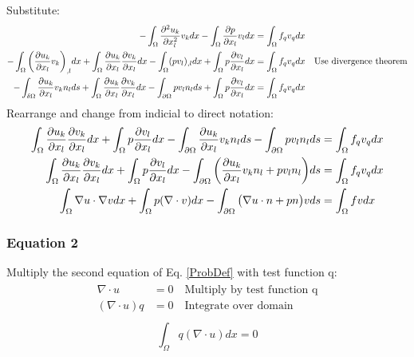 \documentclass[12pt,3p]{article}
\begin{document}
Substitute: 
\begin{align*}
- \int_{\Omega} \pdv[2]{u_k}{x_l} v_k dx - \int_{\Omega} \pdv{p}{x_l} v_l dx &= \int_{\Omega} f _q v_q dx \\
- \int_{\Omega} \bigg(\pdv{u_k}{x_l} v_k \bigg)_{,l} dx + \int_{\Omega} \pdv{u_k}{x_l} \pdv{v_k}{x_l} dx - \int_{\Omega} (p v_l)_{,l} dx + \int_{\Omega} p \pdv{v_l}{x_l} dx &= \int_{\Omega} f _q v_q dx \quad \text{Use divergence theorem} \\
- \int_{\delta \Omega} \pdv{u_k}{x_l} v_k n_l ds + \int_{\Omega} \pdv{u_k}{x_l} \pdv{v_k}{x_l} dx - \int_{\partial \Omega} p v_l n_l ds + \int_{\Omega} p \pdv{v_l}{x_l} dx &= \int_{\Omega} f _q v_q dx 
\end{align*}
Rearrange and change from indicial to direct notation: 
\begin{align*}
\begin{split}
\int_{\Omega} \pdv{u_k}{x_l} \pdv{v_k}{x_l} dx + \int_{\Omega} p \pdv{v_l}{x_l} dx - \int_{\partial \Omega} \pdv{u_k}{x_l} v_k n_l ds - \int_{\partial \Omega} p v_l n_l ds&= \int_{\Omega} f _q v_q dx   \\ 
\int_{\Omega} \pdv{u_k}{x_l} \pdv{v_k}{x_l} dx + \int_{\Omega} p \pdv{v_l}{x_l} dx - \int_{\partial \Omega} \bigg( \pdv{u_k}{x_l} v_k n_l + p v_l n_l \bigg) ds &= \int_{\Omega} f _q v_q dx  \\
\int_{\Omega} \nabla u \cdot \nabla v dx +  \int_{\Omega} p (\nabla \cdot v) dx - \int_{\partial \Omega} \big( \nabla u \cdot n  + p n \big) v ds&=  \int_{\Omega} f v dx 
\end{split}
\end{align*}

\subsubsection{Equation 2} 
Multiply the second equation of Eq. \ref{ProbDef} with test function q:
\begin{align*}
\begin{split}
\nabla \cdot u &= 0 \quad \text{Multiply by test function q}\\
(\nabla \cdot u) q &= 0 \quad \text{Integrate over domain} \\
\end{split}
\end{align*}
\begin{equation}\label{WeakForm2}
\int_{\Omega} q (\nabla \cdot u) dx = 0 
\end{equation}
\end{document}
